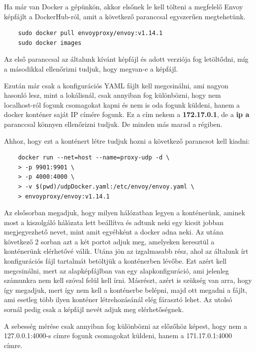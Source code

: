 \documentclass[a4paper,oneside]{article}
\begin{document}
Ha már van Docker a gépünkön, akkor elsőnek le kell tölteni a megfelelő Envoy
képfájlt a DockerHub-ról, amit a következő paranccsal egyszerűen megtehetünk.
\begin{center}
  \begin{verbatim}
    sudo docker pull envoyproxy/envoy:v1.14.1
    sudo docker images
  \end{verbatim}
\end{center}
Az első paranccsal az általunk kívánt képfájl és adott verziója fog letöltődni,
míg a másodikkal ellenőrizni tudjuk, hogy megvan-e a képfájl.

Ezután már csak a konfigurációs YAML fájlt kell megcsinálni, ami nagyon hasonló
lesz, mint a lokálisnál, csak annyiban fog különbözni, hogy nem localhost-ról
fogunk csomagokat kapni és nem is oda fogunk küldeni, hanem a docker konténer
saját IP címére fogunk. Ez a cím nekem a \textbf{172.17.0.1}, de a \textbf{ip a}
paranccsal könnyen ellenőrizni tudjuk. De minden más marad a régiben.

Ahhoz, hogy ezt a konténert létre tudjuk hozni a következő parancsot kell kiadni:
\begin{center}
  \begin{verbatim}
    docker run --net=host --name=proxy-udp -d \
    > -p 9901:9901 \
    > -p 4000:4000 \
    > -v $(pwd)/udpDocker.yaml:/etc/envoy/envoy.yaml \
    > envoyproxy/envoy:v1.14.1
  \end{verbatim}
\end{center}
Az elsősorban megadjuk, hogy milyen hálózatban legyen a konténerünk, aminek most a
kiszolgáló hálózata lett beállítva és adtunk neki egy kicsit jobban megjegyezhető
nevet, mint amit egyébként a docker adna neki. Az utána következő 2 sorban azt
a két portot adjuk meg, amelyeken keresztül a konténerünk elérhetővé válik. Utána
jön az izgalmasabb rész, ahol az általunk írt konfigurációs fájl tartalmát betöltjük a
konténerben lévőbe. Ezt azért kell megcsinálni, mert az alapképfájlban van egy
alapkonfiguráció, ami jelenleg számunkra nem kell szóval felül kell írni.
Másrészt, azért is szükség van arra, hogy így megadjuk, mert így nem kell a
konténerbe belépni, majd ott megadni a fájlt, ami esetleg több ilyen konténer
létrehozásánál elég fárasztó lehet. Az utolsó sornál pedig csak a képfájl nevét
adjuk meg elérhetőségnek.

A sebesség mérése csak annyiban fog különbözni az előzőhöz képest, hogy nem a
127.0.0.1:4000-s címre fogunk csomagokat küldeni, hanem a 171.17.0.1:4000 címre.\\
\end{document}
